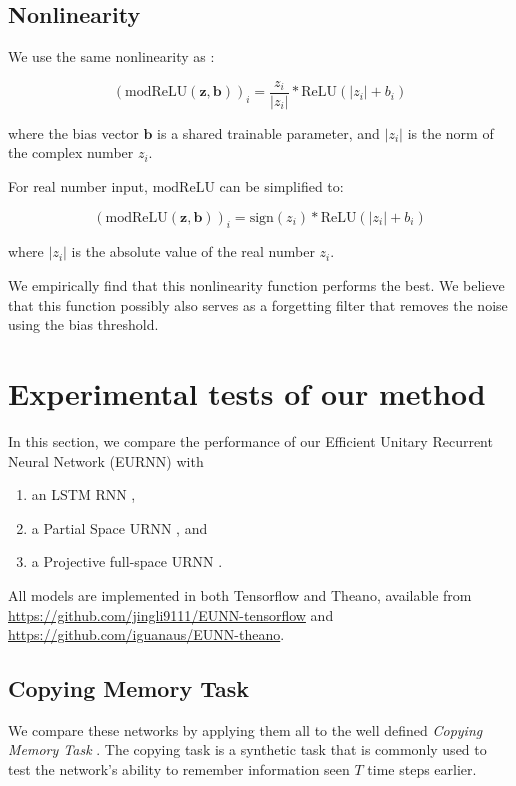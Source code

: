 \subsection{Nonlinearity}
We use the same nonlinearity as \cite{arjovsky2015unitary}:

\begin{equation}
(\mathrm{modReLU}(\mathbf{z}, \mathbf{b}))_i = \frac{z_i}{|z_i|}*\mathrm{ReLU}(|z_i| + b_i)
\end{equation}

where the bias vector $\mathbf{b}$ is a shared trainable parameter, and $|z_i|$ is the norm of the complex number $z_i$. 

For real number input, $\mathrm{modReLU}$ can be simplified to:

\begin{equation}
(\mathrm{modReLU}(\mathbf{z}, \mathbf{b}))_i = \mathrm{sign}(z_i)*\mathrm{ReLU}(|z_i| + b_i)
\end{equation}

where $|z_i|$ is the absolute value of the real number $z_i$. 

We empirically find that this nonlinearity function performs the best. We believe that this function possibly also serves as a forgetting filter that removes the noise using the bias threshold.

\section{Experimental tests of our method}

In this section, we compare the performance of our Efficient Unitary Recurrent Neural Network (EURNN) with

\begin{enumerate}
\item an LSTM RNN \cite{hochreiter1997long},
\item a Partial Space URNN \cite{arjovsky2015unitary}, and \item a Projective full-space URNN \cite{wisdom2016full}. 
\end{enumerate}

All models are implemented in both Tensorflow and Theano, available from \url{https://github.com/jingli9111/EUNN-tensorflow} and \url{https://github.com/iguanaus/EUNN-theano}.

\subsection{Copying Memory Task} We compare these networks by applying them all to the well defined {\it Copying Memory Task} \cite{hochreiter1997long,arjovsky2015unitary,henaff2016orthogonal}. The copying task is a synthetic task that is commonly used to test the network's ability to remember information seen $T$ time steps earlier. 

